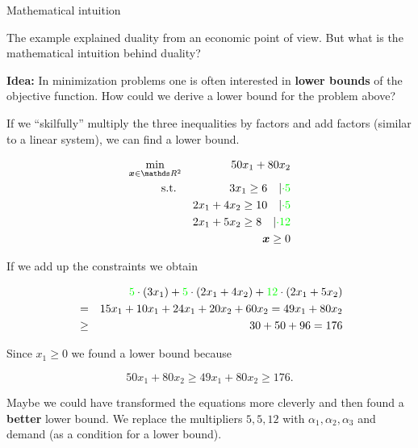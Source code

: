 \normalsize
\begin{vbframe}{Mathematical intuition}

The example explained duality from an economic point of view. But what is the mathematical intuition behind duality?

\lz

\textbf{Idea: } In minimization problems one is often interested in \textbf{lower bounds} of the objective function. How could we derive a lower bound for the problem above?

\lz

If we \enquote{skilfully} multiply the three inequalities by factors and add factors (similar to a linear system), we can find a lower bound.

\framebreak
\vspace*{-1.6cm}

\begin{eqnarray*}
\min_{\bm{x}\in \R^2} && 50x_1 + 80x_2  \\
\text{s.t. } && 3x_1 \ge 6 \quad \vert\textcolor{green}{\cdot 5}\\
&& 2x_1 + 4x_2 \ge 10 \quad \vert \textcolor{green}{\cdot 5} \\
&& 2x_1 + 5x_2 \ge 8 \quad \vert \textcolor{green}{\cdot 12} \\
&& \bm{x} \ge 0
\end{eqnarray*}

\vspace*{-0.2cm}

If we add up the constraints we obtain

\vspace*{-0.5cm}
\begin{eqnarray*}
& & \textcolor{green}{5} \cdot (3x_1) + \textcolor{green}{5} \cdot (2x_1 + 4x_2) + \textcolor{green}{12} \cdot (2x_1 + 5x_2)
\\ &=& 15x_1 + 10x_1 + 24x_1 + 20x_2 + 60x_2 = 49 x_1 + 80 x_2 \\
&\ge& 30 + 50 + 96 = 176
\end{eqnarray*}

Since $x_1 \ge 0$ we found a lower bound because

$$
50x_1 + 80 x_2 \ge 49 x_1 + 80 x_2 \ge 176.
$$

\framebreak

Maybe we could have transformed the equations more cleverly and then found a \textbf{better} lower bound. We replace the multipliers $5, 5, 12$ with $\alpha_1, \alpha_2, \alpha_3$ and demand (as a condition for a lower bound).


\end{vbframe}
